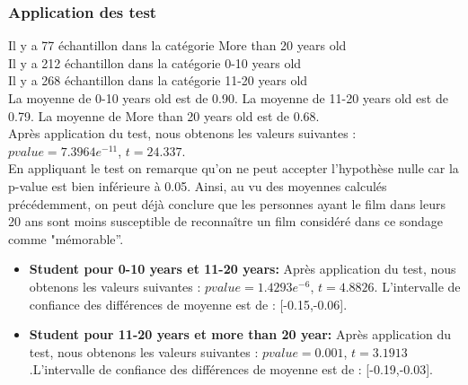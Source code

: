 \documentclass{article} %
\begin{document}
\subsubsection{ Application des test}
Il y a 77 échantillon dans la catégorie More than 20 years old\\
Il y a 212 échantillon dans la catégorie 0-10 years old\\
Il y a 268 échantillon dans la catégorie 11-20 years old\\
La moyenne de 0-10 years old est de 0.90. La moyenne de 11-20 years old est de 0.79. La moyenne de More than 20 years old est de 0.68.\\
Après application du test, nous obtenons les valeurs suivantes : $pvalue =   7.3964e^{-11}$, $t = 24.337$.\\
En appliquant le test on remarque qu'on ne peut accepter l'hypothèse nulle car la p-value est bien inférieure à 0.05. Ainsi, au vu des moyennes calculés précédemment, on peut déjà conclure que les personnes ayant le film dans leurs 20 ans sont moins susceptible de reconnaître un film considéré dans ce sondage comme "mémorable”.
\begin{itemize}
	\item \textbf{Student pour 0-10 years et 11-20 years: } Après application du test, nous obtenons les valeurs suivantes : $pvalue =   1.4293e^{-6}$, $t = 4.8826$. L'intervalle de confiance des différences de moyenne est de : [-0.15,-0.06].\\
	\item \textbf{Student pour 11-20 years et more than 20 year: }Après application du test, nous obtenons les valeurs suivantes : $pvalue =   0.001$, $t = 3.1913$.L'intervalle de confiance des différences de moyenne est de : [-0.19,-0.03].\\
\end{itemize}
\end{document}
